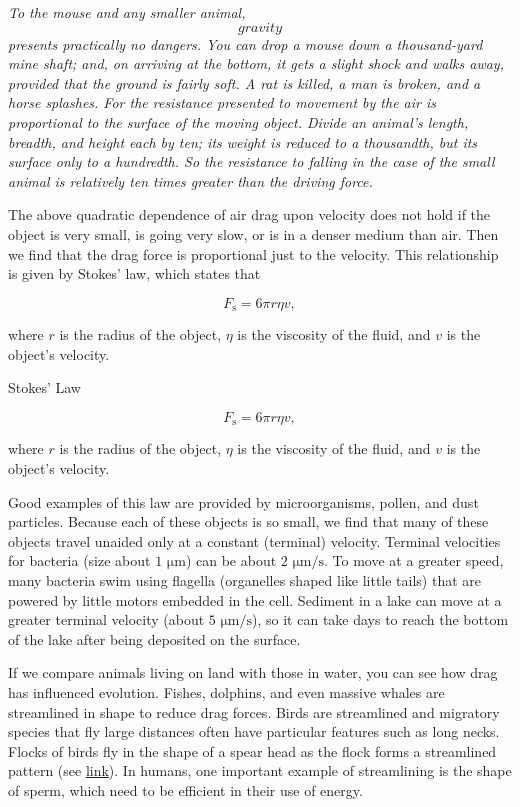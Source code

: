 \documentclass[
]{book}
\begin{document}
\emph{To the mouse and any smaller animal, \[gravity\] presents practically
no dangers. You can drop a mouse down a thousand-yard mine shaft; and,
on arriving at the bottom, it gets a slight shock and walks away,
provided that the ground is fairly soft. A rat is killed, a man is
broken, and a horse splashes. For the resistance presented to movement
by the air is proportional to the surface of the moving object. Divide
an animal's length, breadth, and height each by ten; its weight is
reduced to a thousandth, but its surface only to a hundredth. So the
resistance to falling in the case of the small animal is relatively ten
times greater than the driving force.}

The above quadratic dependence of air drag upon velocity does not hold
if the object is very small, is going very slow, or is in a denser
medium than air. Then we find that the drag force is proportional just
to the velocity. This relationship is given by \protect\hypertarget{import-auto-id1165298672873}{}{Stokes'
law}, which states that

\leavevmode{}%
\[{{F_{\text{s}} = 6{\pi r\eta v}},}{}\]

where \(r\) is the radius of the object, \(\eta\) is the viscosity of the
fluid, and \(v\) is the object's velocity.

\hypertarget{fs-id1165296679489}{}
Stokes' Law

\leavevmode{}%
\[{{F_{\text{s}} = 6{\pi r\eta v}},}{}\]

where \(r\) is the radius of the object, \(\eta\) is the viscosity of the
fluid, and \(v\) is the object's velocity.

Good examples of this law are provided by microorganisms, pollen, and
dust particles. Because each of these objects is so small, we find that
many of these objects travel unaided only at a constant (terminal)
velocity. Terminal velocities for bacteria (size about \(\text{1\ μm}\))
can be about \(\text{2\ μm/s}\). To move at a greater speed, many bacteria
swim using flagella (organelles shaped like little tails) that are
powered by little motors embedded in the cell. Sediment in a lake can
move at a greater terminal velocity (about \(\text{5\ μm/s}\)), so it can
take days to reach the bottom of the lake after being deposited on the
surface.

If we compare animals living on land with those in water, you can see
how drag has influenced evolution. Fishes, dolphins, and even massive
whales are streamlined in shape to reduce drag forces. Birds are
streamlined and migratory species that fly large distances often have
particular features such as long necks. Flocks of birds fly in the shape
of a spear head as the flock forms a streamlined pattern (see
\protect\hyperlink{import-auto-id1165298645387}{link}). In
humans, one important example of streamlining is the shape of sperm,
which need to be efficient in their use of energy.
\end{document}
